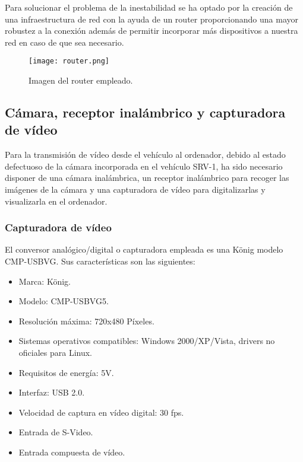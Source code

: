 Para solucionar el problema de la inestabilidad se ha optado por la creación de una infraestructura de red con la ayuda de un router proporcionando una mayor robustez a la conexión además de permitir incorporar más dispositivos a nuestra red en caso de que sea necesario. \\

\begin{figure}[H]
  \begin{center}
    \texttt{[image: router.png]}
  \end{center}
  \caption{Imagen del router empleado.}
  \label{Imagen del router empleado}
\end{figure}

\subsection{Cámara, receptor inalámbrico y capturadora de vídeo}

Para la transmisión de vídeo desde el vehículo al ordenador, debido al estado defectuoso de la cámara incorporada en el vehículo SRV-1, ha sido necesario disponer de una cámara inalámbrica, un receptor inalámbrico para recoger las imágenes de la cámara y una capturadora de vídeo para digitalizarlas y visualizarla en el ordenador.

\subsubsection {Capturadora de vídeo}

El conversor analógico/digital o capturadora empleada es una König modelo CMP-USBVG. Sus características son las siguientes:
 
\begin{itemize}
\item Marca: König.
\item Modelo: CMP-USBVG5.
\item Resolución máxima: 720x480 Píxeles.
\item Sistemas operativos compatibles: Windows 2000/XP/Vista, drivers no oficiales para Linux.
\item Requisitos de energía: 5V.
\item Interfaz:	USB 2.0.
\item Velocidad de captura en vídeo digital: 30 fps.
\item Entrada de S-Video.
\item Entrada compuesta de vídeo.		
\end{itemize}

